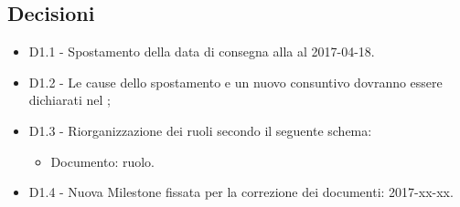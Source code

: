 \documentclass[a4paper,titlepage]{article}
\begin{document}
 \subsection{Decisioni}
 \begin{itemize}
 \item D1.1 - Spostamento della data di consegna alla \RP{} al 2017-04-18.
 \item D1.2 - Le cause dello spostamento e un nuovo consuntivo dovranno essere dichiarati nel \PPdocRP{};
  \item D1.3 - Riorganizzazione dei ruoli secondo il seguente schema:
  	\begin{itemize}
  		\item Documento: ruolo.
  	\end{itemize}
  \item D1.4 - Nuova Milestone fissata per la correzione dei documenti: 2017-xx-xx.
 \end{itemize}
\end{document}
